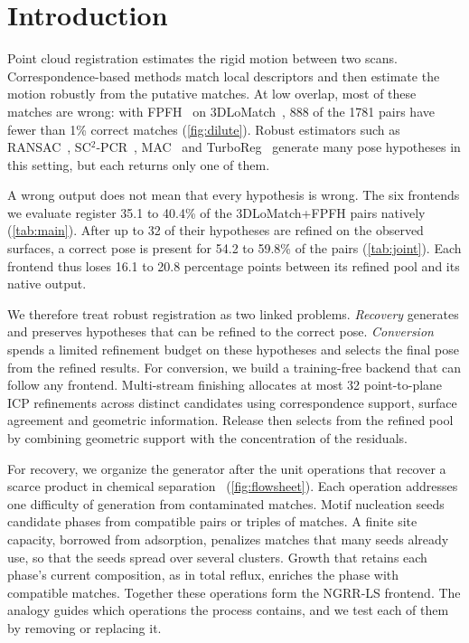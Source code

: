 \section{Introduction}
\label{sec:intro}

Point cloud registration estimates the rigid motion between two scans. Correspondence-based methods match local descriptors and then estimate the motion robustly from the putative matches. At low overlap, most of these matches are wrong: with FPFH~\cite{rusu2009fpfh} on 3DLoMatch~\cite{huang2021predator}, 888 of the 1781 pairs have fewer than 1\% correct matches (\cref{fig:dilute}). Robust estimators such as RANSAC~\cite{fischler1981ransac}, SC$^2$-PCR~\cite{chen2022sc2}, MAC~\cite{zhang2023mac} and TurboReg~\cite{yan2025turboreg} generate many pose hypotheses in this setting, but each returns only one of them.

A wrong output does not mean that every hypothesis is wrong. The six frontends we evaluate register 35.1 to 40.4\% of the 3DLoMatch+FPFH pairs natively (\cref{tab:main}). After up to 32 of their hypotheses are refined on the observed surfaces, a correct pose is present for 54.2 to 59.8\% of the pairs (\cref{tab:joint}). Each frontend thus loses 16.1 to 20.8 percentage points between its refined pool and its native output.

We therefore treat robust registration as two linked problems. \emph{Recovery} generates and preserves hypotheses that can be refined to the correct pose. \emph{Conversion} spends a limited refinement budget on these hypotheses and selects the final pose from the refined results. For conversion, we build a training-free backend that can follow any frontend. Multi-stream finishing allocates at most 32 point-to-plane ICP refinements across distinct candidates using correspondence support, surface agreement and geometric information. Release then selects from the refined pool by combining geometric support with the concentration of the residuals.

For recovery, we organize the generator after the unit operations that recover a scarce product in chemical separation~\cite{mccabe2005,mullin2001} (\cref{fig:flowsheet}). Each operation addresses one difficulty of generation from contaminated matches. Motif nucleation seeds candidate phases from compatible pairs or triples of matches. A finite site capacity, borrowed from adsorption, penalizes matches that many seeds already use, so that the seeds spread over several clusters. Growth that retains each phase's current composition, as in total reflux, enriches the phase with compatible matches. Together these operations form the NGRR-LS frontend. The analogy guides which operations the process contains, and we test each of them by removing or replacing it.

